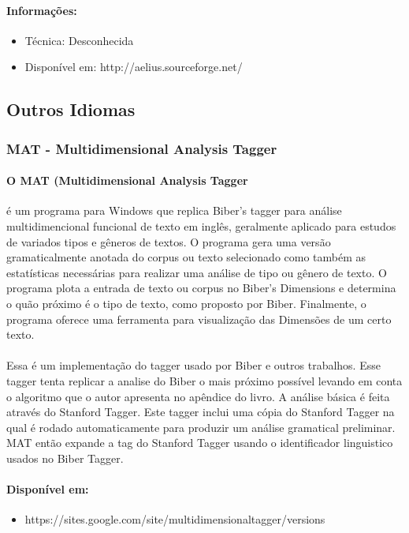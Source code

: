\documentclass[a4paper, 10pt]{article}
\begin{document}
                \paragraph{Informações:}
                \begin{itemize}
                    \item Técnica: Desconhecida
                    \item Disponível em: http://aelius.sourceforge.net/
                \end{itemize}
        \subsection{Outros Idiomas}
        	\subsubsection{MAT - Multidimensional Analysis Tagger}
            	\paragraph{O MAT (Multidimensional Analysis Tagger}
            	é um programa para Windows que replica Biber's tagger para análise multidimencional funcional de texto em inglês, geralmente aplicado para estudos de variados tipos e gêneros de textos. O programa gera uma versão gramaticalmente anotada do corpus ou texto selecionado como também as estatísticas necessárias para realizar uma análise de tipo ou gênero de texto. O programa plota a entrada de texto ou corpus no Biber's Dimensions e determina o quão próximo é o tipo de texto, como proposto por Biber. Finalmente, o programa oferece uma ferramenta para visualização das Dimensões de um certo texto.
                \paragraph{}
                Essa é um implementação do tagger usado por Biber e outros trabalhos. Esse tagger tenta replicar a analise do Biber o mais próximo possível levando em conta o algoritmo que o autor apresenta no apêndice do livro. A análise básica é feita através do Stanford Tagger. Este tagger inclui uma cópia do Stanford Tagger na qual é rodado automaticamente para produzir um análise gramatical preliminar. MAT então expande a tag do Stanford Tagger usando o identificador linguistico usados no Biber Tagger. 
                
                \paragraph{Disponível em:}
                \begin{itemize}
                    \item https://sites.google.com/site/multidimensionaltagger/versions
                \end{itemize}
\end{document}
